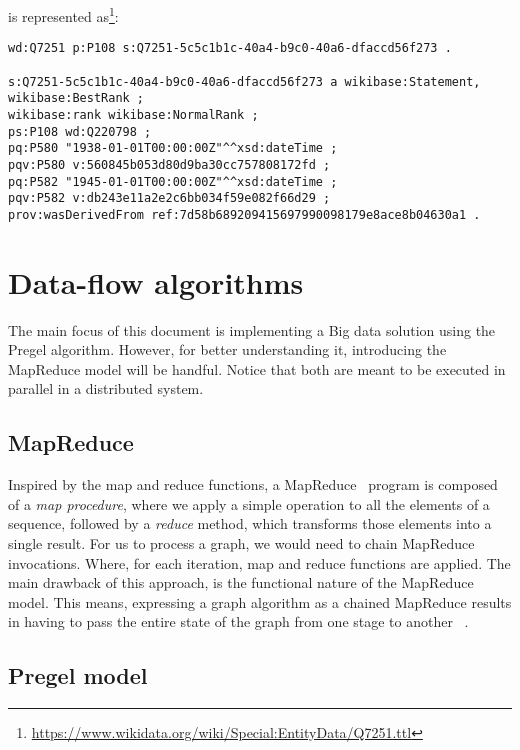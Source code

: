 is represented as\footnote{\url{https://www.wikidata.org/wiki/Special:EntityData/Q7251.ttl}}:

\begin{lstlisting}[style=Turtle]
wd:Q7251 p:P108 s:Q7251-5c5c1b1c-40a4-b9c0-40a6-dfaccd56f273 .

s:Q7251-5c5c1b1c-40a4-b9c0-40a6-dfaccd56f273 a wikibase:Statement,
wikibase:BestRank ;
wikibase:rank wikibase:NormalRank ;
ps:P108 wd:Q220798 ;
pq:P580 "1938-01-01T00:00:00Z"^^xsd:dateTime ;
pqv:P580 v:560845b053d80d9ba30cc757808172fd ;
pq:P582 "1945-01-01T00:00:00Z"^^xsd:dateTime ;
pqv:P582 v:db243e11a2e2c6bb034f59e082f66d29 ;
prov:wasDerivedFrom ref:7d58b689209415697990098179e8ace8b04630a1 .
\end{lstlisting}

\section{Data-flow algorithms}

The main focus of this document is implementing a Big data solution using the Pregel algorithm. However, for better understanding it, introducing the MapReduce model will be handful. Notice that both are meant to be executed in parallel in a distributed system.

\subsection{MapReduce}

Inspired by the map and reduce functions, a MapReduce~\cite{wiki:MapReduce} program is composed of a \textit{map procedure}, where we apply a simple operation to all the elements of a sequence, followed by a \textit{reduce} method, which transforms those elements into a single result. For us to process a graph, we would need to chain MapReduce invocations. Where, for each iteration, map and reduce functions are applied. The main drawback of this approach, is the functional nature of the MapReduce model. This means, expressing a graph algorithm as a chained MapReduce results in having to pass the entire state of the graph from one stage to another~\cite{10.1145/1807167.1807184} .

\subsection{Pregel model}

